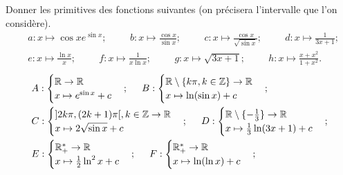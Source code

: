 \documentclass[10pt]{article}
\begin{document}
\begin{tcolorbox}[enhanced, width=7in, center, size=fbox, fontupper=\large, drop shadow southwest]
    Donner les primitives des fonctions suivantes (on précisera l'intervalle que l'on considère).
    \begin{align*}
        &a:x\mapsto\cos{xe^{\sin{x}}}; \hspace{1cm} b:x\mapsto\frac{\cos x}{\sin x}; \hspace{1cm} c:x\mapsto\frac{\cos x}{\sqrt{\sin x}}; \hspace{1cm} d:x\mapsto\frac{1}{3x+1};\\
        &e:x\mapsto\frac{\ln x}{x}; \hspace{1cm} f:x\mapsto\frac{1}{x\ln x}; \hspace{1cm} g:x\mapsto\sqrt{3x+1}; \hspace{1cm} h:x\mapsto\frac{x+x^2}{1+x^2}.
    \end{align*}
    \begin{align*}
        &A:\begin{cases}\mathbb{R}\rightarrow\mathbb{R}\\x\mapsto e^{\sin x} + c\end{cases}; \hspace{0.5cm} B:\begin{cases}\mathbb{R}\setminus\{k\pi, k\in\mathbb{Z}\}\rightarrow\mathbb{R}\\x\mapsto\ln(\sin x) + c\end{cases}; \hspace{0.5cm}\\
        &C:\begin{cases}]2k\pi, (2k+1)\pi[, k\in\mathbb{Z}\rightarrow\mathbb{R}\\x\mapsto2\sqrt{\sin x} + c\end{cases}; \hspace{0.5cm} D:\begin{cases}\mathbb{R}\setminus\{-\frac{1}{3}\}\rightarrow\mathbb{R}\\x\mapsto\frac{1}{3}\ln(3x+1) + c\end{cases};\\
        &E:\begin{cases}\mathbb{R_+^*}\rightarrow\mathbb{R}\\x\mapsto\frac{1}{2}\ln^2x + c\end{cases}; \hspace{0.5cm} F:\begin{cases}\mathbb{R_+^*}\rightarrow\mathbb{R}\\x\mapsto\ln(\ln x) + c\end{cases};\\

\end{align*}
\end{tcolorbox}
\end{document}
